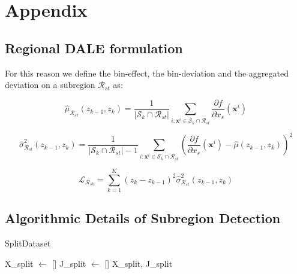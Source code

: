 \documentclass[12pt]{article}
\newcommand{\dfdx}{\frac{\partial f}{\partial x_s}}
\begin{document}


\section{Appendix}

\subsection{Regional DALE formulation}
\label{sec:regional_dale}

For this reason we define the bin-effect, the bin-deviation and the aggregated deviation on a subregion \(\mathcal{R}_{st}\) as:

\begin{equation}
    \label{eq:bin_effect_subregion}
    \hat{\mu}_{\mathcal{R}_{st}}(z_{k-1}, z_k) = \frac{1}{|\mathcal{S}_k \cap \mathcal{R}_{st}|} \sum_{i:\mathbf{x}^i \in \mathcal{S}_k \cap \mathcal{R}_{st} } \dfdx(\mathbf{x}^i)
\end{equation}

\begin{equation}
  \label{eq:bin_deviation_subregion}
  \hat{\sigma}_{\mathcal{R}_{st}}^2(z_{k-1}, z_k) = \frac{1}{|\mathcal{S}_k \cap \mathcal{R}_{st}| - 1}
\sum_{i:\mathbf{x}^i \in \mathcal{S}_k \cap \mathcal{R}_{st} } \left ( \dfdx(\mathbf{x}^i) -
    \hat{\mu}(z_{k-1}, z_k) \right )^2
\end{equation}

\begin{equation}
  \label{eq:SE}
  \mathcal{L}_{\mathcal{R}_{sk}} = \sum_{k=1}^K (z_k - z_{k-1})^2 \hat{\sigma}_{\mathcal{R}_{st}}^2(z_{k-1}, z_k)
\end{equation}


\subsection{Algorithmic Details of Subregion Detection}

    \begin{algorithm}
\caption{SplitDataset}
\label{alg:split_dataset}
\SetAlgoLined
{}
X\_split $\gets$ []\;
J\_split $\gets$ []\;
\Return X\_split, J\_split
\end{algorithm}
\end{document}
